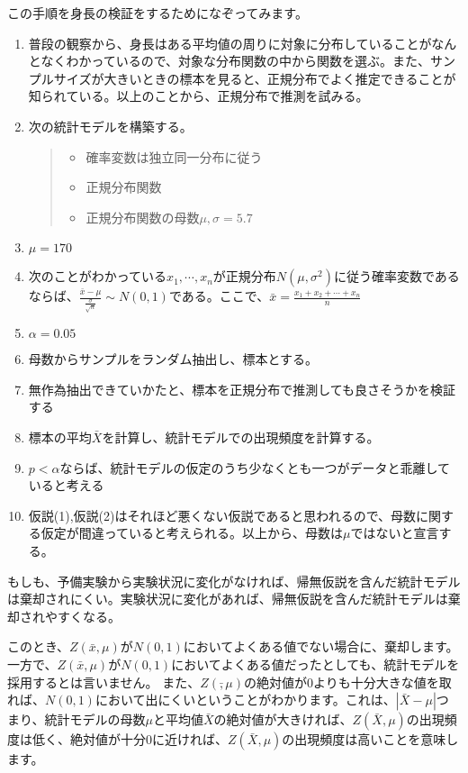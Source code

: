 

この手順を身長の検証をするためになぞってみます。
\begin{enumerate}
    \item 普段の観察から、身長はある平均値の周りに対象に分布していることがなんとなくわかっているので、対象な分布関数の中から関数を選ぶ。また、サンプルサイズが大きいときの標本を見ると、正規分布でよく推定できることが知られている。以上のことから、正規分布で推測を試みる。
    \item 次の統計モデルを構築する。
    \begin{quote}
        \begin{itemize}
            \item 確率変数は独立同一分布に従う
            \item 正規分布関数
            \item 正規分布関数の母数$\mu,\sigma=5.7$
        \end{itemize}
    \end{quote}
    \item $\mu=170$
    \item 次のことがわかっている$x_1,\cdots,x_n$が正規分布$N(\mu,\sigma^2)$に従う確率変数であるならば、$\frac{\bar{x}-\mu}{\frac{\sigma}{\sqrt{n}}}\sim N(0,1)$である。ここで、$\bar{x}=\frac{x_1+x_2+\cdots+x_n}{n}$
    \item $\alpha=0.05$
    \item 母数からサンプルをランダム抽出し、標本とする。
    \item 無作為抽出できていかたと、標本を正規分布で推測しても良さそうかを検証する
    \item 標本の平均$\bar{X}$を計算し、統計モデルでの出現頻度を計算する。
    \item $p<\alpha$ならば、統計モデルの仮定のうち少なくとも一つがデータと乖離していると考える
    \item 仮説(1),仮説(2)はそれほど悪くない仮説であると思われるので、母数に関する仮定が間違っていると考えられる。以上から、母数は$\mu$ではないと宣言する。
\end{enumerate}

もしも、予備実験から実験状況に変化がなければ、帰無仮説を含んだ統計モデルは棄却されにくい。実験状況に変化があれば、帰無仮説を含んだ統計モデルは棄却されやすくなる。


\fi



このとき、$Z(\bar{x},\mu)$が$N(0,1)$においてよくある値でない場合に、棄却します。
一方で、$Z(\bar{x},\mu)$が$N(0,1)$においてよくある値だったとしても、統計モデルを採用するとは言いません。
また、$Z(\bar,\mu)$の絶対値が$0$よりも十分大きな値を取れば、$N(0,1)$において出にくいということがわかります。これは、$|\bar{X}-\mu|$つまり、統計モデルの母数$\mu$と平均値$\bar{X}$の絶対値が大きければ、$Z(\bar{X},\mu)$の出現頻度は低く、絶対値が十分$0$に近ければ、$Z(\bar{X},\mu)$の出現頻度は高いことを意味します。


